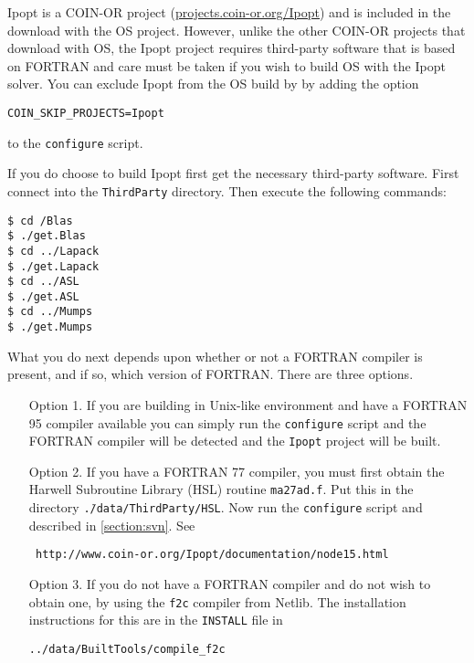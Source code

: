 \documentclass[11pt]{article}
\renewcommand{\_}{{\char"5F}}
\renewcommand{\{}{{\char"7B}}
\renewcommand{\}}{{\char"7D}}
\renewcommand{\^}{{\char"0D}}
\renewcommand{\'}{{\char"0D}}
\begin{document}
Ipopt is a COIN-OR project (\url{projects.coin-or.org/Ipopt}) and is included in the download with the OS project. However, unlike the other COIN-OR projects that download with OS, the Ipopt project requires third-party software that is based on FORTRAN and care must be taken if you wish to build OS with the  Ipopt solver.  You can  exclude Ipopt from the OS  build by  by adding the option

\begin{verbatim}
COIN_SKIP_PROJECTS=Ipopt
\end{verbatim}
to the {\tt configure} script. 


If you do choose to build Ipopt first get the necessary third-party software.  First connect into the {\tt ThirdParty} directory. Then execute the following commands:

\begin{verbatim}
$ cd /Blas
$ ./get.Blas
$ cd ../Lapack
$ ./get.Lapack
$ cd ../ASL
$ ./get.ASL 
$ cd ../Mumps
$ ./get.Mumps 
\end{verbatim}

What you do next depends upon whether or not a FORTRAN compiler is present, and if so, which version of FORTRAN.  There are three options.

\begin{itemize}

\item[Option 1.]   If you are building in Unix-like environment and have a FORTRAN 95 compiler available you can simply run the {\tt configure} script and the FORTRAN compiler will be detected and the {\tt Ipopt} project will be built. 

\item[Option 2.]   If you have a FORTRAN 77 compiler, you  must first obtain the  Harwell Subroutine Library (HSL) routine {\tt ma27ad.f}.  Put this in the directory {\tt \../data/ThirdParty/HSL}.  Now run the {\tt configure} script and described in \ref{section:svn}.  See

\begin{verbatim}
 http://www.coin-or.org/Ipopt/documentation/node15.html
 \end{verbatim}

\item[Option 3.]  If you do not have a FORTRAN compiler and do not wish to obtain one, by using the {\tt f2c} compiler from Netlib.  The installation instructions for this are in the {\tt INSTALL} file in 
\begin{verbatim}
../data/BuiltTools/compile_f2c
\end{verbatim}

\end{itemize}
\end{document}
